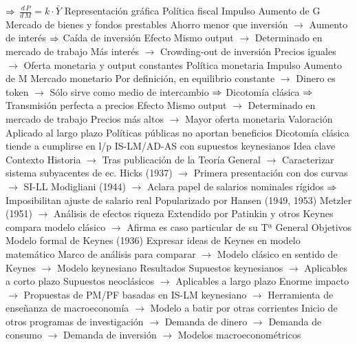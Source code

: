 \documentclass{nuevotema}
\begin{document}
\begin{esquemal}
				\4[] $\Rightarrow$ $\frac{d \, P}{d \, M} = k \cdot \bar{Y}$
			\3 Representación gráfica
				\4 
			\3 Política fiscal
				\4 Impulso
				\4[] Aumento de G
				\4 Mercado de bienes y fondos prestables
				\4[] Ahorro menor que inversión
				\4[] $\to$ Aumento de interés
				\4[] $\Rightarrow$ Caída de inversión
				\4 Efecto
				\4[] Mismo output
				\4[] $\to$ Determinado en mercado de trabajo
				\4[] Más interés
				\4[] $\to$ Crowding-out de inversión
				\4[] Precios iguales
				\4[] $\to$ Oferta monetaria y output constantes
			\3 Política monetaria
				\4 Impulso
				\4[] Aumento de M
				\4 Mercado monetario
				\4[] Por definición, en equilibrio constante
				\4[] $\to$ Dinero es token
				\4[] $\to$ Sólo sirve como medio de intercambio
				\4[] $\Rightarrow$ Dicotomía clásica
				\4[] $\Rightarrow$ Transmisión perfecta a precios
				\4 Efecto
				\4[] Mismo output
				\4[] $\to$ Determinado en mercado de trabajo
				\4[] Precios más altos
				\4[] $\to$ Mayor oferta monetaria
			\3 Valoración
				\4 Aplicado al largo plazo
				\4 Políticas públicas no aportan beneficios
				\4 Dicotomía clásica tiende a cumplirse en l/p
		\2 IS-LM/AD-AS con supuestos keynesianos
			\3 Idea clave
				\4 Contexto
				\4[] Historia
				\4[] $\to$ Tras publicación de la Teoría General
				\4[] $\to$ Caracterizar sistema subyacentes de ec.
				\4[] Hicks (1937)
				\4[] $\to$ Primera presentación con dos curvas
				\4[] $\to$ SI-LL
				\4[] Modigliani (1944)
				\4[] $\to$ Aclara papel de salarios nominales rígidos
				\4[] $\Rightarrow$ Imposibilitan ajuste de salario real
				\4[] Popularizado por Hansen (1949, 1953)
				\4[] Metzler (1951)
				\4[] $\to$ Análisis de efectos riqueza
				\4[] Extendido por Patinkin y otros
				\4[] Keynes compara modelo clásico
				\4[] $\to$ Afirma es caso particular de su Tª General
				\4 Objetivos
				\4[] Modelo formal de Keynes (1936)
				\4[] Expresar ideas de Keynes en modelo matemático
				\4[] Marco de análisis para comparar
				\4[] $\to$ Modelo clásico en sentido de Keynes
				\4[] $\to$ Modelo keynesiano
				\4 Resultados
				\4[] Supuestos keynesianos
				\4[] $\to$ Aplicables a corto plazo
				\4[] Supuestos neoclásicos
				\4[] $\to$ Aplicables a largo plazo
				\4[] Enorme impacto
				\4[] $\to$ Propuestas de PM/PF basadas en IS-LM keynesiano
				\4[] $\to$ Herramienta de enseñanza de macroeconomía
				\4[] $\to$ Modelo a batir por otras corrientes
				\4[] Inicio de otros programas de investigación
				\4[] $\to$ Demanda de dinero
				\4[] $\to$ Demanda de consumo
				\4[] $\to$ Demanda de inversión
				\4[] $\to$ Modelos macroeconométricos

\end{esquemal}
\end{document}
